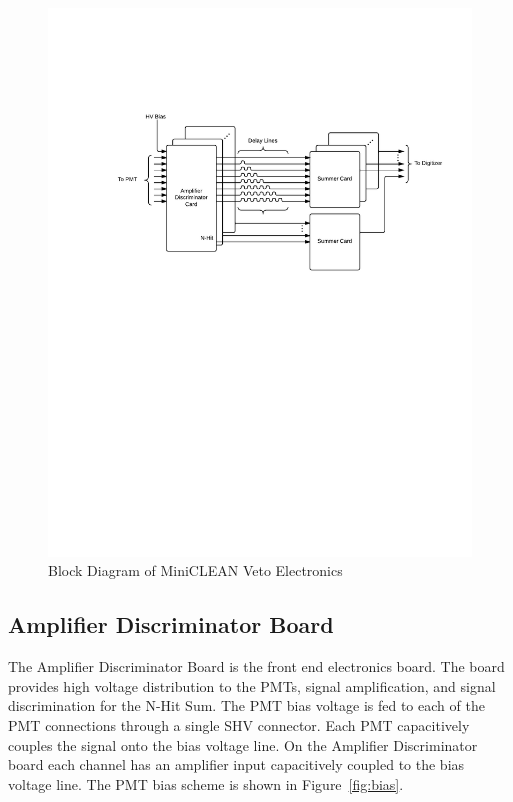 \documentclass{JINST}
\begin{document}
\begin{figure}[ht]
\begin{center}
\includegraphics[width=5in, keepaspectratio=true, trim=1.25in 5.75in 0.5in 2in, clip=true]{graphics/block}
\caption{Block Diagram of MiniCLEAN Veto Electronics
\label{fig:block_diagram}}
\end{center}
\end{figure}

\subsection{Amplifier Discriminator Board}
\label{sec:Amp-Disc}
%
The Amplifier Discriminator Board is the front end electronics board.
The board provides high voltage distribution to the PMTs, signal
amplification, and signal discrimination for the N-Hit Sum.  The PMT
bias voltage is fed to each of the PMT connections through a single
SHV connector.  Each PMT capacitively couples the signal onto the bias
voltage line.  On the Amplifier Discriminator board each channel has
an amplifier input capacitively coupled to the bias voltage line.  The
PMT bias scheme is shown in Figure~\ref{fig:bias}.
\end{document}
